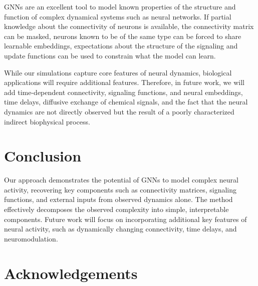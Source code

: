 \documentclass[10pt,twocolumn]{article}
\begin{document}
GNNs are an excellent tool to model known properties of the structure and function of complex dynamical systems such as neural networks.  If partial knowledge about the connectivity of neurons is available, the connectivity matrix can be masked, neurons known to be of the same type can be forced to share learnable embeddings, expectations about the structure of the signaling and update functions can be used to constrain what the model can learn.

While our simulations capture core features of neural dynamics, biological applications will require additional features. Therefore, in future work, we will add time-dependent connectivity, signaling functions, and neural embeddings, time delays, diffusive exchange of chemical signals, and the fact that the neural dynamics are not directly observed but the result of a poorly characterized indirect biophysical process.

\section{Conclusion}

Our approach demonstrates the potential of GNNs to model complex neural activity, recovering key components such as connectivity matrices, signaling functions, and external inputs from observed dynamics alone.  The method effectively decomposes the observed complexity into simple, interpretable components. Future work will focus on incorporating additional key features of neural activity, such as dynamically changing connectivity, time delays, and neuromodulation.



\section*{Acknowledgements}
\end{document}
